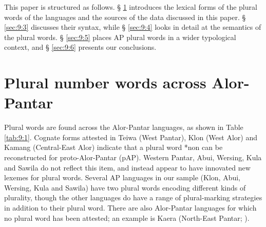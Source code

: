 This paper is structured as follows. {\S} \ref{sec:9:2} introduces the lexical forms of the plural words of the languages and the sources of the data discussed in this paper. {\S} \ref{sec:9:3} discusses their syntax, while {\S} \ref{sec:9:4} looks in detail at the semantics of the plural words. {\S} \ref{sec:9:5} places AP plural words in a wider typological context, and {\S} \ref{sec:9:6} presents our conclusions.

\section{Plural number words across Alor-Pantar}  %
\label{sec:9:2}
Plural words are found across the Alor-Pantar languages, as shown in Table \ref{tab:9:1}. Cognate forms attested in Teiwa (West Pantar), Klon (West Alor) and Kamang (Central-East Alor) indicate that a plural word *non can be reconstructed for proto-Alor-Pantar (pAP). Western Pantar, Abui, Wersing, Kula and Sawila do not reflect this item, and instead appear to have innovated new lexemes for plural words. Several AP languages in our sample (Klon, Abui, Wersing, Kula and Sawila) have two plural words encoding different kinds of plurality, though the other languages do have a range of plural-marking strategies in addition to their plural word. There are also Alor-Pantar languages for which no plural word has been attested; an example is Kaera (North-East Pantar; \citealt{Klamertakaera}).



